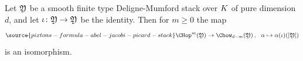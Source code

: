 \begin{lemma}
\notready\label{lem:op_eq_ch_for_smooth}
Let $\frak Y$ be a smooth finite type Deligne-Mumford stack over ${K}$ of pure dimension $d$, and
let $\iota\colon \frak Y \to \frak Y$ be the identity. Then for $m \geq 0$ the map
\begin{equation}\label{eq_chop_to_chow}
\source{pixtons-formula-abel-jacobi-picard-stack}
\CHop^m(\frak Y) \to \Chow_{d-m}(\frak Y)\,, \ \ \alpha \mapsto \alpha(\iota)([\frak Y])
\end{equation}
is an isomorphism.
\end{lemma}

